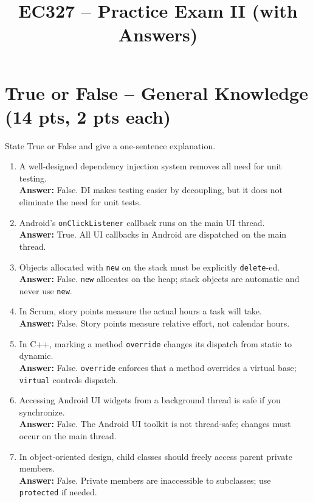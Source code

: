 \documentclass[12pt]{article}
\title{EC327 – Practice Exam II (with Answers)}
\date{}
\begin{document}
\maketitle

\section{True or False – General Knowledge (14 pts, 2 pts each)}
State True or False and give a one-sentence explanation.
\begin{enumerate}[label=\arabic*.]
\item A well-designed dependency injection system removes all need for unit testing.\\
\textbf{Answer:} False. DI makes testing easier by decoupling, but it does not eliminate the need for unit tests.
\item Android’s \texttt{onClickListener} callback runs on the main UI thread.\\
\textbf{Answer:} True. All UI callbacks in Android are dispatched on the main thread.
\item Objects allocated with \texttt{new} on the stack must be explicitly \texttt{delete}-ed.\\
\textbf{Answer:} False. \texttt{new} allocates on the heap; stack objects are automatic and never use \texttt{new}.
\item In Scrum, story points measure the actual hours a task will take.\\
\textbf{Answer:} False. Story points measure relative effort, not calendar hours.
\item In C++, marking a method \texttt{override} changes its dispatch from static to dynamic.\\
\textbf{Answer:} False. \texttt{override} enforces that a method overrides a virtual base; \texttt{virtual} controls dispatch.
\item Accessing Android UI widgets from a background thread is safe if you synchronize.\\
\textbf{Answer:} False. The Android UI toolkit is not thread-safe; changes must occur on the main thread.
\item In object-oriented design, child classes should freely access parent private members.\\
\textbf{Answer:} False. Private members are inaccessible to subclasses; use \texttt{protected} if needed.
\end{enumerate}
\end{document}
